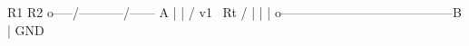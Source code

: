 \begin{DoxyVerb}            R1                R2
    o-----/\/\/\------------/\/\/\------- A
                                            |
                                            |         
                                            /         
v1                                      \ Rt    
                                            /         
                                            |         
                                            |         
                                            |    
 o-----------------------------------------B
                                            |
                                        GND\end{DoxyVerb}
 